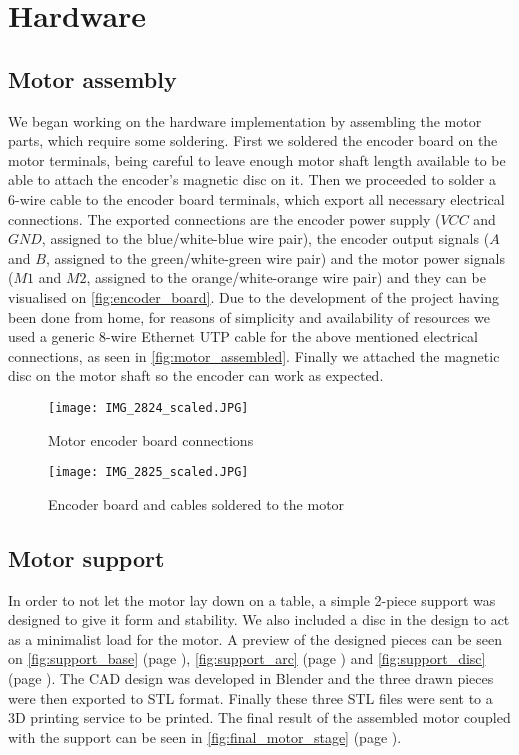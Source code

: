 \section{Hardware} \label{sec:hardware-devel}

\subsection{Motor assembly}
We began working on the hardware implementation by assembling the motor parts, which require some soldering.
First we soldered the encoder board on the motor terminals, being careful to leave enough motor shaft length available to be able to attach the encoder's magnetic disc on it.
Then we proceeded to solder a 6-wire cable to the encoder board terminals, which export all necessary electrical connections.
The exported connections are the encoder power supply ($VCC$ and $GND$, assigned to the blue/white-blue wire pair), the encoder output signals ($A$ and $B$, assigned to the green/white-green wire pair) and the motor power signals ($M1$ and $M2$, assigned to the orange/white-orange wire pair) and they can be visualised on \autoref{fig:encoder_board}.
Due to the development of the project having been done from home, for reasons of simplicity and availability of resources we used a generic 8-wire Ethernet UTP cable for the above mentioned electrical connections, as seen in \autoref{fig:motor_assembled}.
Finally we attached the magnetic disc on the motor shaft so the encoder can work as expected.

\begin{figure}[t]
	\centering
	\texttt{[image: IMG\_2824\_scaled.JPG]}
	\caption{Motor encoder board connections}
	\label{fig:encoder_board}
\end{figure}

\begin{figure}[t]
	\centering
	\texttt{[image: IMG\_2825\_scaled.JPG]}
	\caption{Encoder board and cables soldered to the motor}
	\label{fig:motor_assembled}
\end{figure}

\subsection{Motor support}
In order to not let the motor lay down on a table, a simple 2-piece support was designed to give it form and stability.
We also included a disc in the design to act as a minimalist load for the motor.
A preview of the designed pieces can be seen on \autoref{fig:support_base} (page \pageref{fig:support_base}), \autoref{fig:support_arc} (page \pageref{fig:support_arc}) and \autoref{fig:support_disc} (page \pageref{fig:support_disc}).
The CAD design was developed in Blender \cite{sw:blender} and the three drawn pieces were then exported to STL format.
Finally these three STL files were sent to a 3D printing service to be printed.
The final result of the assembled motor coupled with the support can be seen in \autoref{fig:final_motor_stage} (page \pageref{fig:final_motor_stage}).

